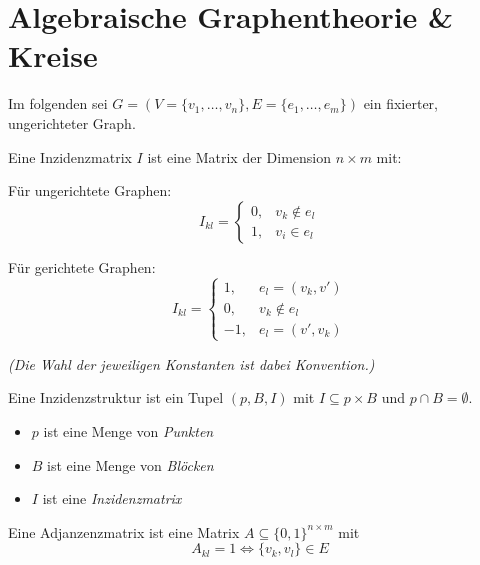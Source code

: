 \chapter{Algebraische Graphentheorie \& Kreise}

Im folgenden sei $ G = (V = \{ v_1, \dots, v_n \}, E = \{ e_1, \dots, e_m \}) $ ein fixierter, ungerichteter Graph.

\begin{definition}[Inzidenzmatrix]
    Eine Inzidenzmatrix $ I $ ist eine Matrix der Dimension $ n \times m $ mit:
    \begin{multicols}{2}
        Für ungerichtete Graphen:
        \begin{equation*}
            I_{kl} = \begin{cases}
                0, & v_k \notin e_l \\
                1, & v_i \in e_l
            \end{cases}
        \end{equation*}
        \columnbreak

        Für gerichtete Graphen:
        \begin{equation*}
            I_{kl} = \begin{cases}
                1, & e_l = (v_k, v') \\
                0, & v_k \notin e_l \\
                -1, & e_l = (v', v_k)
            \end{cases}
        \end{equation*}
    \end{multicols}

    \textit{(Die Wahl der jeweiligen Konstanten ist dabei Konvention.)}
\end{definition}

\begin{definition}[Inzidenzstruktur]
    Eine Inzidenzstruktur ist ein Tupel $ (p, B, I) $ mit $ I \subseteq p \times B $ und $ p \cap B = \emptyset $.
    \begin{itemize}
        \item $ p $ ist eine Menge von \textit{Punkten}
        \item $ B $ ist eine Menge von \textit{Blöcken}
        \item $ I $ ist eine \textit{Inzidenzmatrix}
    \end{itemize}
\end{definition}

\begin{definition}[Adjanzenzmatrix]
    Eine Adjanzenzmatrix ist eine Matrix $ A \subseteq \{ 0, 1 \}^{n \times m} $ mit
    \begin{equation*}
        A_{kl} = 1 \Leftrightarrow \{ v_k, v_l \} \in E
    \end{equation*}
\end{definition}

